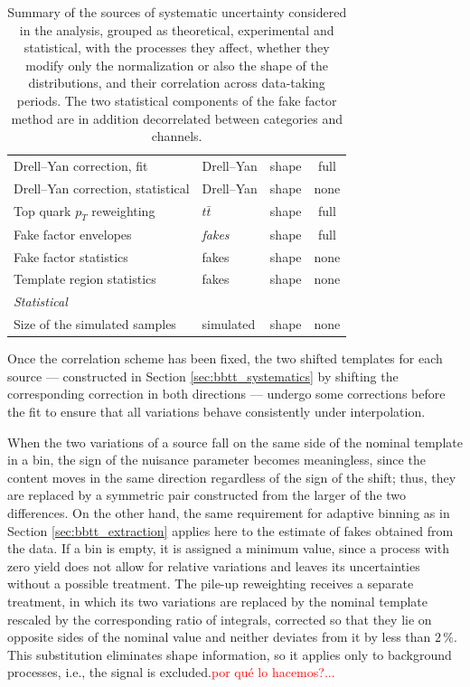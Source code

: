 \begin{table}[tbp]
\begin{tabular}{lllc}
\addlinespace
Drell--Yan correction, fit                & Drell--Yan             & shape & full    \\
Drell--Yan correction, statistical        & Drell--Yan             & shape & none    \\
Top quark $p_T$ reweighting               & $t\bar{t}$             & shape & full    \\
\addlinespace
Fake factor envelopes                     & \textit{fakes}         & shape & full    \\
Fake factor statistics                    & fakes         & shape & none    \\
Template region statistics                & fakes         & shape & none    \\
\midrule
\multicolumn{4}{l}{\textit{Statistical}} \\
\midrule
Size of the simulated samples             & simulated              & shape & none    \\
\bottomrule
\end{tabular}
\caption[Summary of the systematic uncertainties]{%
    Summary of the sources of systematic uncertainty considered in the analysis, grouped
    as theoretical, experimental and statistical, with the processes they affect, whether
    they modify only the normalization or also the shape of the distributions, and their
    correlation across data-taking periods. The two statistical components of the fake
    factor method are in addition decorrelated between categories and channels.
}
\label{tab:systematics_summary}
\end{table}



Once the correlation scheme has been fixed, the two shifted templates for each source — constructed in Section \ref{sec:bbtt_systematics} by shifting the corresponding correction in both directions — undergo some corrections before the fit to ensure that all variations behave consistently under interpolation.

When the two variations of a source fall on the same side of the nominal template in a bin, the sign of the nuisance parameter becomes meaningless, since the content moves in the same direction regardless of the sign of the shift; thus, they are replaced by a symmetric pair constructed from the larger of the two differences. On the other hand, the same requirement for adaptive binning as in Section \ref{sec:bbtt_extraction} applies here to the estimate of fakes obtained from the data. If a bin is empty, it is assigned a minimum value, since a process with zero yield does not allow for relative variations and leaves its uncertainties without a possible treatment. The pile-up reweighting receives a separate treatment, in which its two variations are replaced by the nominal template rescaled by the corresponding ratio of integrals, corrected so that they lie on opposite sides of the nominal value and neither deviates from it by less than $2\,\%$. This substitution eliminates shape information, so it applies only to background processes, i.e., the signal is excluded.\textcolor{red}{por qué lo hacemos?...}\medskip




